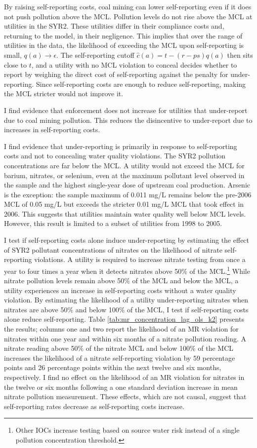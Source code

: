 \documentclass[12pt]{article}
\begin{document}
By raising self-reporting costs, coal mining can lower self-reporting even if it does not push pollution above the MCL. Pollution levels do not rise above the MCL at utilities in the SYR2. These utilities differ in their compliance costs and, returning to the model, in their negligence. This implies that over the range of utilities in the data, the likelihood of exceeding the MCL upon self-reporting is small, $q(a) \rightarrow \epsilon$. The self-reporting cutoff $\hat{c}(a) = t - (r-ps)q(a)$ then sits close to $t$, and a utility with no MCL violation to conceal decides whether to report by weighing the direct cost of self-reporting against the penalty for under-reporting. Since self-reporting costs are enough to reduce self-reporting, making the MCL stricter would not improve it.

I find evidence that enforcement does not increase for utilities that under-report due to coal mining pollution. This reduces the disincentive to under-report due to increases in self-reporting costs.

I find evidence that under-reporting is primarily in response to self-reporting costs and not to concealing water quality violations. The SYR2 pollution concentrations are far below the MCL. A utility would not exceed the MCL for barium, nitrates, or selenium, even at the maximum pollutant level observed in the sample and the highest single-year dose of upstream coal production. Arsenic is the exception: the sample maximum of 0.011 mg/L remains below the pre-2006 MCL of 0.05 mg/L but exceeds the stricter 0.01 mg/L MCL that took effect in 2006. This suggests that utilities maintain water quality well below MCL levels. However, this result is limited to a subset of utilities from 1998 to 2005. 
 
I test if self-reporting costs alone induce under-reporting by estimating the effect of SYR2 pollutant concentrations of nitrates on the likelihood of nitrate self-reporting violations. A utility is required to increase nitrate testing from once a year to four times a year when it detects nitrates above 50\% of the MCL.\footnote{Other IOCs increase testing based on source water risk instead of a single pollution concentration threshold.} While nitrate pollution levels remain above 50\% of the MCL and below the MCL, a utility experiences an increase in self-reporting costs without a water quality violation. By estimating the likelihood of a utility under-reporting nitrates when nitrates are above 50\% and below 100\% of the MCL, I test if self-reporting costs alone reduce self-reporting. Table \ref{tab:mr_concentration_lag_ols_k2} presents the results; columns one and two report the likelihood of an MR violation for nitrates within one year and within six months of a nitrate pollution reading. A nitrate reading above 50\% of the nitrate MCL and below 100\% of the MCL increases the likelihood of a nitrate self-reporting violation by 59 percentage points and 26 percentage points within the next twelve and six months, respectively. I find no effect on the likelihood of an MR violation for nitrates in the twelve or six months following a one standard deviation increase in mean nitrate pollution measurement. These effects, which are not causal, suggest that self-reporting rates decrease as self-reporting costs increase.
\end{document}
